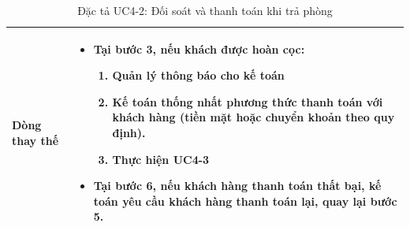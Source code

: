 \begin{table}[H]
\begin{tabularx}{\textwidth}{|>{\centering\arraybackslash\bfseries}m{3.5cm}|X|}
    Dòng thay thế & 
    \vspace{0.2cm}
    \begin{itemize}[leftmargin=*, nosep, label=-]
        \item \textbf{Tại bước 3}, nếu khách được hoàn cọc:
        \begin{enumerate}[label=\arabic*A., start=4]
            \item Quản lý thông báo cho kế toán
            \item Kế toán thống nhất phương thức thanh toán với khách hàng (tiền mặt hoặc chuyển khoản theo quy định).
            \item Thực hiện \textbf{UC4-3}
        \end{enumerate}
        \item \textbf{Tại bước 6}, nếu khách hàng thanh toán thất bại, kế toán yêu cầu khách hàng thanh toán lại, quay lại bước 5.
    \end{itemize} \\ 
    \hline
\end{tabularx}
\caption{Đặc tả UC4-2: Đối soát và thanh toán khi trả phòng}
\label{tab:uc4-2}
\end{table}



